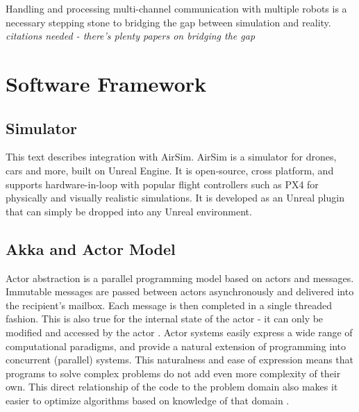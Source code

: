 \documentclass{article}
\begin{document}
Handling and processing multi-channel communication with multiple robots is a necessary stepping stone to bridging the gap between simulation and reality. \emph{citations needed - there's plenty papers on bridging the gap}




\section{Software Framework}

\subsection{Simulator}
This text describes integration with AirSim. AirSim is a simulator for drones, cars and more, built on Unreal Engine. It is open-source, cross platform, and supports hardware-in-loop with popular flight controllers such as PX4 for physically and visually realistic simulations. It is developed as an Unreal plugin that can simply be dropped into any Unreal environment. \cite{shah2018airsim}

\subsection{Akka and Actor Model}
Actor abstraction is a parallel programming model based on actors and messages. Immutable messages are passed between actors asynchronously and delivered into the recipient's mailbox. Each message is then completed in a single threaded fashion. This is also true for the internal state of the actor - it can only be modified and accessed by the actor \cite{scala-akka-streams}. Actor systems easily express a wide range of computational paradigms, and provide a natural extension of programming into concurrent (parallel) systems. This naturalness and ease of expression means that programs to solve complex problems do not add even more complexity of their own. This direct relationship of the code to the problem domain also makes it easier to optimize algorithms based on knowledge of that domain \cite{actor-foundation}.
\end{document}
